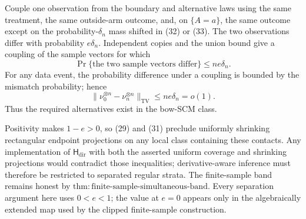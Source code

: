 Couple one observation from the boundary and alternative laws using the same treatment, the same outside-arm outcome, and, on \(\{A=a\}\), the same outcome except on the probability-\(\delta_n\) mass shifted in (32) or (33).  The two observations differ with probability \(e\delta_n\).  Independent copies and the union bound give a coupling of the sample vectors for which
\[
 \Pr\{\text{the two sample vectors differ}\}\le ne\delta_n.
\]
For any data event, the probability difference under a coupling is bounded by the mismatch probability; hence
\[
 \|\nu_0^{\otimes n}-\nu_n^{\otimes n}\|_{\mathrm{TV}}
 \le ne\delta_n=o(1). \tag{35}
\]
Thus the required alternatives exist in the bow-SCM class.

Positivity makes \(1-e>0\), so (29) and (31) preclude uniformly shrinking rectangular endpoint projections on any local class containing these contacts.  Any implementation of \(\mathsf H_{\mathrm{dir}}\) with both the asserted uniform coverage and shrinking projections would contradict those inequalities; derivative-aware inference must therefore be restricted to separated regular strata.  The finite-sample band remains honest by \(\mathrm{thm:finite\text{-}sample\text{-}simultaneous\text{-}band}\).  Every separation argument here uses \(0<e<1\); the value at \(e=0\) appears only in the algebraically extended map used by the clipped finite-sample construction.